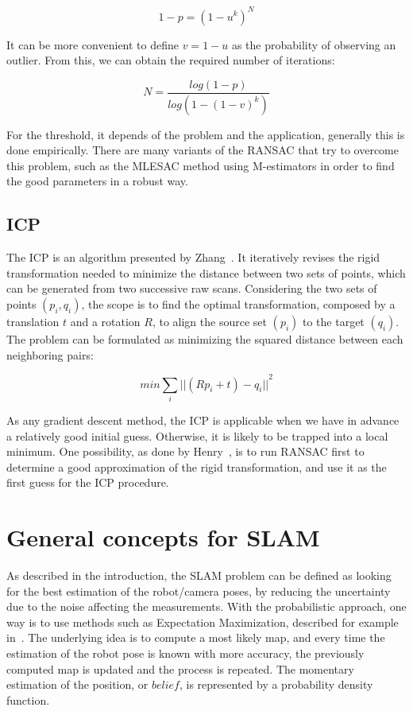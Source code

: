 \[
1-p = (1-u^k)^N
\]

It can be more convenient to define $v=1-u$ as the probability of observing an outlier. From this, we can obtain the required number of iterations:

\[
N = \frac{log(1-p)}{log(1-(1-v)^k)}
\]

For the threshold, it depends of the problem and the application, generally this is done empirically. There are many variants of the \gls{RANSAC} that try to overcome this problem, such as the MLESAC method \cite{TorrZ00} using M-estimators in order to find the good parameters in a robust way.


\subsection{ICP}

The \gls{ICP} is an algorithm presented by Zhang~\cite{zhang_92_icp}.
It iteratively revises the rigid transformation needed to minimize the distance between two sets of points, which can be generated from two successive raw scans. Considering the two sets of points $(p_{i}, q_{i})$, the scope is to find the optimal transformation, composed by a translation $t$ and a rotation $R$, to align the source set $(p_{i})$ to the target $(q_{i})$. The problem can be formulated as minimizing the squared distance between each neighboring pairs:

\[min \sum_{i}{||(Rp_{i}+t)-q_{i}||}^2\]

As any gradient descent method, the \gls{ICP} is applicable when we have in advance a relatively good initial guess. Otherwise, it is likely to be trapped into a local minimum. One possibility, as done by Henry~\cite{Henry_RGBD_2010}, is to run \gls{RANSAC} first to determine a good approximation of the rigid transformation, and use it as the first guess for the \gls{ICP} procedure.

\clearpage
\section{General concepts for SLAM}

As described in the introduction, the \gls{SLAM} problem can be defined as looking for the best estimation of the robot/camera poses, by reducing the uncertainty due to the noise affecting the measurements. With the probabilistic approach, one way is to use methods such as Expectation Maximization, described for example in~\cite{Thrun_2005}. The underlying idea is to compute a most likely map, and every time the estimation of the robot pose is known with more accuracy, the previously computed map is updated and the process is repeated. The momentary estimation of the position, or $belief$, is represented by a probability density function. 

